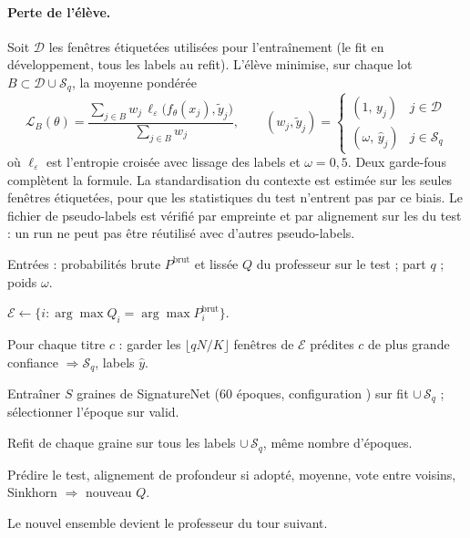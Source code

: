 \paragraph{Perte de l'élève.} Soit $\mathcal{D}$ les fenêtres étiquetées utilisées pour l'entraînement (le fit en développement, tous les labels au refit). L'élève minimise, sur chaque lot $B\subset\mathcal{D}\cup\mathcal{S}_q$, la moyenne pondérée
\begin{equation}
\mathcal{L}_B(\theta)=\frac{\sum_{j\in B}w_j\,\ell_\varepsilon\big(f_\theta(x_j),\tilde y_j\big)}{\sum_{j\in B}w_j},\qquad
(w_j,\tilde y_j)=\begin{cases}(1,\,y_j) & j\in\mathcal{D}\\ (\omega,\,\hat y_j) & j\in\mathcal{S}_q\end{cases}
\end{equation}
où $\ell_\varepsilon$ est l'entropie croisée avec lissage des labels et $\omega=0{,}5$. Deux garde-fous complètent la formule. La standardisation du contexte est estimée sur les seules fenêtres étiquetées, pour que les statistiques du test n'entrent pas par ce biais. Le fichier de pseudo-labels est vérifié par empreinte et par alignement sur les  du test : un run ne peut pas être réutilisé avec d'autres pseudo-labels.

\begin{algo}[H]
\caption{Un tour d'auto-apprentissage}\label{alg:selftrain}
\begin{algobox}
\item Entrées : probabilités brute $P^{\text{brut}}$ et lissée $Q$ du professeur sur le test ; part $q$ ; poids $\omega$.
\item $\mathcal{E}\leftarrow\{i : \arg\max Q_i=\arg\max P^{\text{brut}}_i\}$.
\item Pour chaque titre $c$ : garder les $\lfloor qN/K\rfloor$ fenêtres de $\mathcal{E}$ prédites $c$ de plus grande confiance $\Rightarrow\mathcal{S}_q$, labels $\hat y$.
\item Entraîner $S$ graines de SignatureNet (60 époques, configuration ) sur fit $\cup\,\mathcal{S}_q$ ; sélectionner l'époque sur valid.
\item Refit de chaque graine sur tous les labels $\cup\,\mathcal{S}_q$, même nombre d'époques.
\item Prédire le test, alignement de profondeur si adopté, moyenne, vote entre voisins, Sinkhorn $\Rightarrow$ nouveau $Q$.
\item Le nouvel ensemble devient le professeur du tour suivant.
\end{algobox}
\end{algo}

